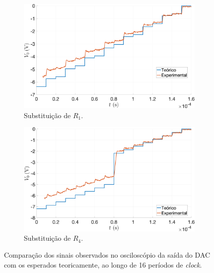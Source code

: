\documentclass[a4paper, oneside]{article}
\begin{document}
\begin{figure}[ht]
	\centering
	\begin{subfigure}[b]{0.5\textwidth}
		\centering
		\includegraphics[width=\textwidth]{figures/5_1_2_DAC_R1.png}
		\caption{Substituição de $R_1$.}
		\label{fig:5_1_2_DAC_R1}
	\end{subfigure}%
	\hfill
	\begin{subfigure}[b]{0.5\textwidth}
		\centering
		\includegraphics[width=\textwidth]{figures/5_1_2_DAC_R4.png}
		\caption{Substituição de $R_4$.}
		\label{fig:5_1_2_DAC_R4}
	\end{subfigure}%
	\caption{Comparação dos sinais observados no osciloscópio da saída do DAC com os esperados teoricamente, ao longo de 16 períodos de \textit{clock}.\\}
	\label{fig:5_1_2_DAC}
\end{figure}
\end{document}
